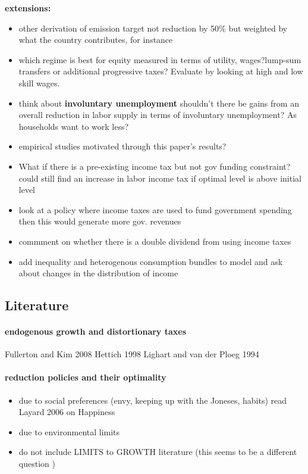 \textbf{extensions:}
\begin{itemize}
	\item other derivation of emission target not reduction by 50\% but weighted by what the country contributes, for instance
	
	\item which  regime is best for equity measured in terms of utility, wages?lump-sum transfers or additional progressive taxes? \ar Evaluate by looking at high and low skill wages. 
	\item think about \textbf{involuntary unemployment} \ar shouldn't there be gains from an overall reduction in labor supply in terms of involuntary unemployment? As households want to work less?
	\item empirical studies motivated through this paper's results?
	\item  What if there is a pre-existing income tax but not gov funding constraint? could still find an increase in labor income tax if optimal level is above initial level
	\item  look at a policy where income taxes are used to fund government spending \ar then this would generate more gov. revenues
	\item commment on whether there is a double dividend from using income taxes
	\item add inequality and heterogenous consumption bundles to model and ask about changes in the distribution of income
\end{itemize} 

\subsection{Literature}

\paragraph{endogenous growth and distortionary taxes}
Fullerton and Kim 2008
\cite{Bovenberg1997EnvironmentalGrowth}
Hettich 1998
Lighart and van der Ploeg 1994
\cite{Loebbing2019NationalChange}


\paragraph{reduction policies and their optimality}
\begin{itemize}
	\item due to social preferences (envy, keeping up with the Joneses, habits) \ar read Layard 2006 on Happiness
	\item due to environmental limits
	\item do not include LIMITS to GROWTH literature (this seems to be a different question )
\end{itemize} 

